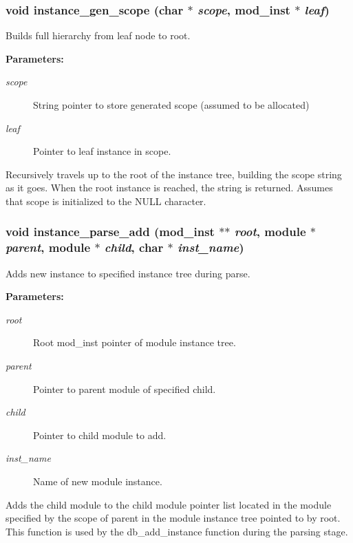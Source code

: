 \subsubsection{\setlength{\rightskip}{0pt plus 5cm}void instance\_\-gen\_\-scope (char $\ast$ {\em scope}, {\bf mod\_\-inst} $\ast$ {\em leaf})}\label{instance_8h_a0}


Builds full hierarchy from leaf node to root.

\begin{Desc}
\item[{\bf Parameters: }]\par
\begin{description}
\item[
{\em scope}]String pointer to store generated scope (assumed to be allocated) \item[
{\em leaf}]Pointer to leaf instance in scope.

\end{description}
\end{Desc}
Recursively travels up to the root of the instance tree, building the scope string as it goes. When the root instance is reached, the string is returned. Assumes that scope is initialized to the NULL character. 
\subsubsection{\setlength{\rightskip}{0pt plus 5cm}void instance\_\-parse\_\-add ({\bf mod\_\-inst} $\ast$$\ast$ {\em root}, {\bf module} $\ast$ {\em parent}, {\bf module} $\ast$ {\em child}, char $\ast$ {\em inst\_\-name})}\label{instance_8h_a3}


Adds new instance to specified instance tree during parse.

\begin{Desc}
\item[{\bf Parameters: }]\par
\begin{description}
\item[
{\em root}]Root mod\_\-inst pointer of module instance tree. \item[
{\em parent}]Pointer to parent module of specified child. \item[
{\em child}]Pointer to child module to add. \item[
{\em inst\_\-name}]Name of new module instance.

\end{description}
\end{Desc}
Adds the child module to the child module pointer list located in the module specified by the scope of parent in the module instance tree pointed to by root. This function is used by the db\_\-add\_\-instance function during the parsing stage. 
